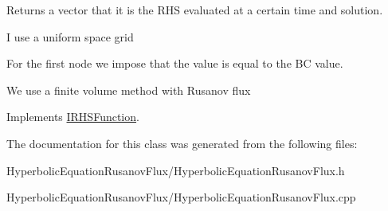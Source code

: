 Returns a vector that it is the RHS evaluated at a certain time and solution. 

I use a uniform space grid

For the first node we impose that the value is equal to the BC value.

We use a finite volume method with Rusanov flux 

Implements \hyperlink{classIRHSFunction}{IRHSFunction}.

The documentation for this class was generated from the following files:\begin{DoxyCompactItemize}
\item 
HyperbolicEquationRusanovFlux/HyperbolicEquationRusanovFlux.h\item 
HyperbolicEquationRusanovFlux/HyperbolicEquationRusanovFlux.cpp\end{DoxyCompactItemize}
